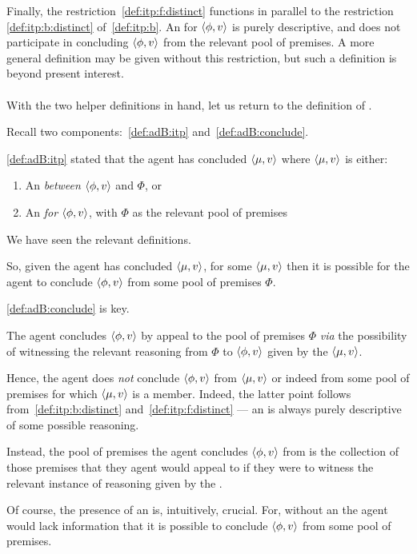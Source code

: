 \begin{note}
  Finally, the restriction~\ref{def:itp:f:distinct} functions in parallel to the restriction \ref{def:itp:b:distinct} of~\autoref{def:itp:b}.
  An  for \(\langle \phi, v \rangle\) is purely descriptive, and does not participate in concluding \(\langle \phi, v \rangle\) from the relevant pool of premises.
  A more general definition may be given without this restriction, but such a definition is beyond present interest.
\end{note}

\paragraph*{\adB{}}

\begin{note}
  With the two helper definitions in hand, let us return to the definition of \adB{}.

  Recall two components:~\ref{def:adB:itp} and~\ref{def:adB:conclude}.

  \ref{def:adB:itp} stated that the agent has concluded \(\langle \mu, v \rangle\) where \(\langle \mu, v \rangle\) is either:
  \begin{enumerate}[label=(\alph*)]
  \item An \itp{} \emph{between} \(\langle \phi, v \rangle\) and \(\Phi\), or
  \item An \itp{} \emph{for} \(\langle \phi, v \rangle\), with \(\Phi\) as the relevant pool of premises
  \end{enumerate}
  We have seen the relevant definitions.

  So, given the agent has concluded \(\langle \mu, v \rangle\), for some  \(\langle \mu, v \rangle\) then it is possible for the agent to conclude \(\langle \phi, v \rangle\) from some pool of premises \(\Phi\).

  \ref{def:adB:conclude} is key.

  The agent concludes \(\langle \phi, v \rangle\) by appeal to the pool of premises \(\Phi\) \emph{via} the possibility of witnessing the relevant reasoning from \(\Phi\) to \(\langle \phi, v \rangle\) given by the  \(\langle \mu, v \rangle\).

  Hence, the agent does \emph{not} conclude \(\langle \phi, v \rangle\) from \(\langle \mu, v \rangle\) or indeed from some pool of premises for which \(\langle \mu, v \rangle\) is a member.
  Indeed, the latter point follows from~\ref{def:itp:b:distinct} and~\ref{def:itp:f:distinct} --- an  is always purely descriptive of some possible reasoning.

  Instead, the pool of premises the agent concludes \(\langle \phi, v \rangle\) from is the collection of those premises that they agent would appeal to if they were to witness the relevant instance of reasoning given by the .

  Of course, the presence of an  is, intuitively, crucial.
  For, without an  the agent would lack information that it is possible to conclude \(\langle \phi, v \rangle\) from some pool of premises.
\end{note}

